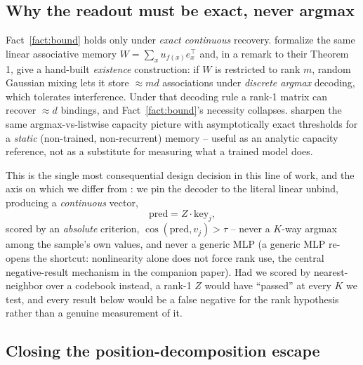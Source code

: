 \subsection{Why the readout must be exact, never argmax}
\label{sec:setup-readout}

Fact~\ref{fact:bound} holds only under \emph{exact continuous} recovery.
\citet{nichani2025factual} formalize the same linear associative memory
$W=\sum_x u_{f(x)}e_x^\top$ and, in a remark to their Theorem 1, give a
hand-built \emph{existence} construction: if $W$ is restricted to rank $m$,
random Gaussian mixing lets it store $\approx md$ associations under
\emph{discrete argmax} decoding, which tolerates interference. Under that
decoding rule a rank-1 matrix can recover $\approx d$ bindings, and
Fact~\ref{fact:bound}'s necessity collapses. \citet{barnfield2026sharp}
sharpen the same argmax-vs-listwise capacity picture with asymptotically
exact thresholds for a \emph{static} (non-trained, non-recurrent) memory --
useful as an analytic capacity reference, not as a substitute for measuring
what a trained model does.

This is the single most consequential design decision in this line of
work, and the axis on which we differ from \citet{nichani2025factual}: we
pin the decoder to the literal linear unbind, producing a
\emph{continuous} vector,
\[
\mathrm{pred} = Z\cdot \mathrm{key}_j,
\]
scored by an \emph{absolute} criterion, $\cos(\mathrm{pred}, v_j) > \tau$
-- never a $K$-way argmax among the sample's own values, and never a
generic MLP (a generic MLP re-opens the shortcut: nonlinearity alone does
not force rank use, the central negative-result mechanism in the companion
paper). Had we scored by nearest-neighbor over a codebook instead, a rank-1
$Z$ would have ``passed'' at every $K$ we test, and every result below
would be a false negative for the rank hypothesis rather than a genuine
measurement of it.

\subsection{Closing the position-decomposition escape}
\label{sec:setup-bottleneck}

